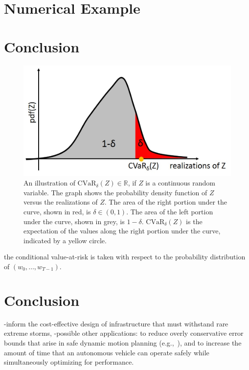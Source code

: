 \documentclass[letterpaper, 10 pt, conference]{ieeeconf}  %
\begin{document}
\section{Numerical Example}\label{ex}

\section{Conclusion}\label{conc}


\begin{figure}[thpb]
      \centering
      \includegraphics[scale=0.5]{cvar.jpg}
      \caption{An illustration of $\text{CVaR}_\delta(Z) \in \mathbb{R}$, if $Z$ is a continuous random variable. 
	  The graph shows the probability density function of $Z$ versus the realizations of $Z$.
	  The area of the right portion under the curve, shown in red, is $\delta \in (0,1)$.	  
	  The area of the left portion under the curve, shown in grey, is $1-\delta$.
	  $\text{CVaR}_\delta(Z)$ is the expectation of the values along the right portion under the curve, indicated by a yellow circle.}
      \label{cvar}
\end{figure}

the conditional value-at-risk is taken with respect to the probability distribution of $(w_0, \dots, w_{T-1})$. 

\section{Conclusion}\label{conclusion}
-inform the cost-effective design of infrastructure that must withstand rare extreme storms,
-possible other applications: to reduce overly conservative error bounds that arise in safe dynamic motion planning (e.g.,~\cite{herbert2017fastrack}), 
and to increase the amount of time that an autonomous vehicle can operate safely while simultaneously optimizing for performance.
\end{document}
